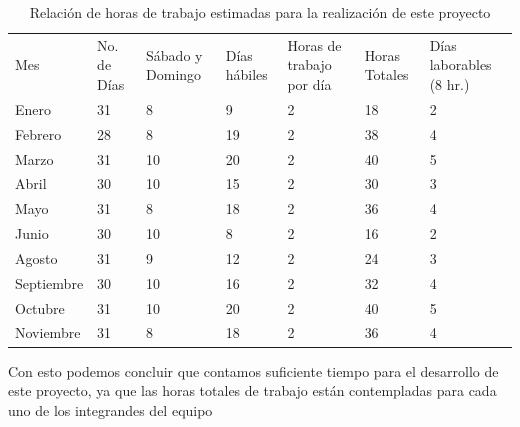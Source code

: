 \documentclass[12pt, a4paper, titlepage]{report}
\begin{document}
    	    \begin{table}[H]
    			\begin{tabular}{|p{1.7cm}|p{1.6cm}||p{1.6cm}||p{1.6cm}||p{1.6cm}|p{1.6cm}|p{1.6cm}|}
    				\hline
    				\rowcolor{guindapoli}
    				\multicolumn{7}{|c|}{\textbf{\textcolor{white}{Horas a trabajar en el desarrollo del proyecto}}}\\
    				\hline
    				\rowcolor{azulfuerte}Mes & No. de Días & Sábado y Domingo & Días h\'abiles & Horas de trabajo por día & Horas Totales & Días laborables (8 hr.)\\
    				\hline
    				\cellcolor{azulclaro}Enero & 31 & 8 & 9 & 2 & 18 & 2\\ 
    				\hline
    				\cellcolor{azulclaro}Febrero & 28 & 8 & 19 & 2 & 38 & 4\\ 
    				\hline
    				\cellcolor{azulclaro}Marzo & 31 & 10 & 20 & 2 & 40 & 5\\ 
    				\hline
    				\cellcolor{azulclaro}Abril & 30 & 10 & 15 & 2 & 30 & 3\\ 
    				\hline
    				\cellcolor{azulclaro}Mayo & 31 & 8 & 18 & 2 & 36 & 4\\
    				\hline
    				\cellcolor{azulclaro}Junio & 30 & 10 & 8 & 2 & 16 & 2\\
    				\hline
    				\cellcolor{azulclaro}Agosto & 31 & 9 & 12 & 2 & 24 & 3\\
    				\hline
    				\cellcolor{azulclaro}Septiembre & 30 & 10 & 16 & 2 & 32 & 4\\ 
    				\hline
    				\cellcolor{azulclaro}Octubre & 31 & 10 & 20 & 2 & 40 & 5\\ 
    				\hline
    				\cellcolor{azulclaro}Noviembre & 31 & 8 & 18 & 2 & 36 & 4\\ 
    				\hline
    			\end{tabular}
    		    \caption[Horas de trabajo]{Relación de horas de trabajo estimadas para la realización de este proyecto}
    		\end{table}
    	    Con esto podemos concluir que contamos suficiente tiempo para el desarrollo de este proyecto, ya que las horas totales de trabajo están contempladas para cada uno de los integrandes del equipo
    	    
\end{document}
